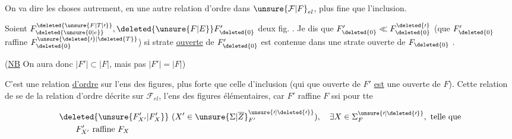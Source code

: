 
On va dire les choses autrement, en  une autre relation d'ordre dans $\unsure{\mathcal{F}|F}_{el}$, plus fine que l'inclusion.


Soient $F_{\deleted{\unsure{0|e}}}^{\deleted{\unsure{F|T|\prime}}},\deleted{\unsure{F|E}}F_{\deleted{0}}'$ deux fig. . Je dis que $F_{\deleted{0}}'\ll F_{\deleted{0}}^{\deleted{\prime}}$ (que $F_{\deleted{0}}'$ raffine $F_{\deleted{0}}^{\unsure{\deleted{\prime}|\deleted{T}}}$) si   strate \uline{ouverte} de $F_{\deleted{0}}'$ est contenue dans une strate ouverte de $F_{\deleted{0}}$ .

(\uline{NB} On aura  donc $|F'|\subset|F|$, mais pas  $|F'|=|F|$)

C'est une relation \uline{d'ordre} sur l'ens des figures, plus forte que celle d'inclusion (qui   que   ouverte de $F'$ \uline{est} une  ouverte de $F$). Cette relation de    se   de la relation d'ordre  décrite sur $\mathcal{F}_{el}$, l'ens des figures élémentaires, car $F'$ raffine $F$ ssi pour tte

\[
\begin{aligned}
&\deleted{\unsure{F'_{X'}|F'_{X}}}\ (X'\in{\unsure{\Sigma|\overline{Z}}}^{\unsure{\prime|\deleted{\prime}}}_{F'}),\quad \exists X\in\Sigma^{\unsure{\prime|\deleted{\prime}}}_F,\ \text{telle que}\\
&\qquad F'_{X'}\ \text{raffine}\ F_X
\end{aligned}
\]
